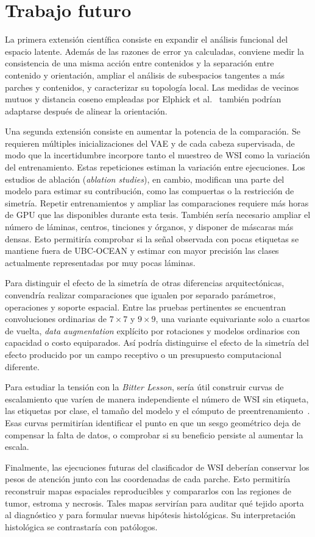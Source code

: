 \chapter{Trabajo futuro}

La primera extensión científica consiste en expandir el análisis funcional
del espacio latente. Además de las razones de error ya calculadas, conviene
medir la consistencia de una misma acción entre contenidos y la separación
entre contenido y orientación, ampliar el análisis de subespacios tangentes a
más parches y contenidos, y caracterizar su topología local. Las medidas de
vecinos mutuos y distancia coseno empleadas por
Elphick et al.~\cite{elphick_rotation_2024} también podrían adaptarse después
de alinear la orientación.

Una segunda extensión consiste en aumentar la potencia de la comparación. Se
requieren múltiples inicializaciones del VAE y de cada cabeza supervisada, de
modo que la incertidumbre incorpore tanto el muestreo de WSI como la variación
del entrenamiento. Estas repeticiones estiman la variación entre ejecuciones.
Los estudios de ablación (\emph{ablation studies}), en cambio, modifican una
parte del modelo para estimar su contribución, como las compuertas o la
restricción de simetría. Repetir entrenamientos y ampliar las comparaciones
requiere más horas de GPU que las disponibles durante esta tesis.
También sería necesario ampliar el número de láminas,
centros, tinciones y órganos, y disponer de máscaras más densas. Esto
permitiría comprobar si la señal observada con pocas etiquetas se mantiene
fuera de UBC-OCEAN y estimar con mayor precisión las clases actualmente
representadas por muy pocas láminas.

Para distinguir el efecto de la simetría de otras diferencias arquitectónicas,
convendría realizar comparaciones que igualen por separado parámetros,
operaciones y soporte espacial. Entre las pruebas pertinentes se
encuentran convoluciones ordinarias de \(7\times7\) y \(9\times9\), una
variante equivariante solo a cuartos de vuelta, \emph{data augmentation} explícito por rotaciones
y modelos ordinarios con capacidad o costo equiparados. Así podría distinguirse
el efecto de la simetría del efecto producido por un campo receptivo o un
presupuesto computacional diferente.

Para estudiar la tensión con la \emph{Bitter Lesson}, sería útil construir curvas de escalamiento que varíen de manera independiente el número
de WSI sin etiqueta, las etiquetas por clase, el tamaño del modelo y el cómputo
de preentrenamiento~\cite{sutton_bitter_lesson_2019}. Esas curvas permitirían
identificar el punto en que un sesgo geométrico deja de compensar la falta de
datos, o comprobar si su beneficio persiste al aumentar la escala.

Finalmente, las ejecuciones futuras del clasificador de WSI deberían conservar
los pesos de atención junto con las coordenadas de cada parche. Esto permitiría
reconstruir mapas espaciales reproducibles y compararlos con las regiones de
tumor, estroma y necrosis. Tales mapas servirían para auditar qué tejido aporta
al diagnóstico y para formular nuevas hipótesis histológicas. Su interpretación
histológica se contrastaría con patólogos.

